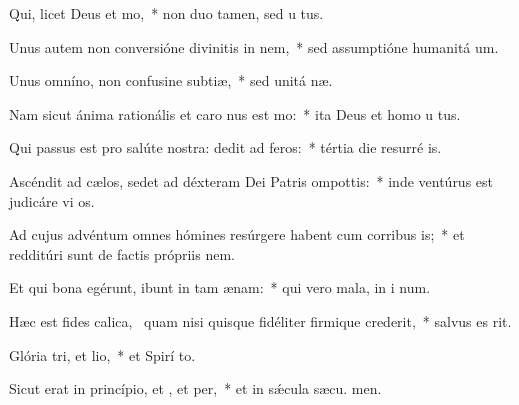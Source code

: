 \item Qui, licet Deus  et mo,~* non duo tamen, sed u  tus.
\item Unus autem non conversióne divinitis in nem,~* sed assumptióne humanitá  um.
\item Unus omníno, non confusine subtiæ,~* sed unitá næ.
\item Nam sicut ánima rationális et caro nus est mo:~* ita Deus et homo u  tus.
\item Qui passus est pro salúte nostra: dedit ad feros:~* tértia die resurré  is.
\item Ascéndit ad cælos, sedet ad déxteram Dei Patris ompottis:~* inde ventúrus est judicáre vi  os.
\item Ad cujus advéntum omnes hómines resúrgere habent cum corribus is;~* et redditúri sunt de factis própriis nem.
\item Et qui bona egérunt, ibunt in tam ænam:~* qui vero mala, in i num.
\item Hæc est fides calica,~\pscross{} quam nisi quisque fidéliter firmique crederit,~* salvus es  rit.
\item Glória tri, et lio,~* et Spirí to.
\item Sicut erat in princípio, et , et per,~* et in sǽcula sæcu. men.
